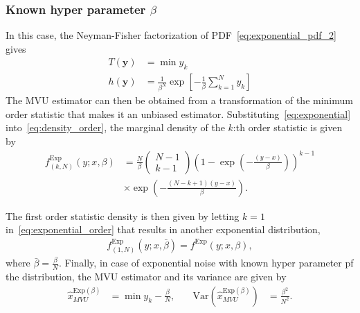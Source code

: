 \documentclass[journal]{IEEEtran}
\begin{document}
\subsubsection{Known hyper parameter $\beta$}
In this case, the Neyman-Fisher factorization of PDF~\eqref{eq:exponential_pdf_2} gives
%
%
\begin{subequations}
	\begin{align}
	T(\bm{y}) &= \min y_k\\
	h(\bm{y}) &=   \frac{1}{\beta^N}\exp\left[-\frac{1}{\beta}\sum_{k=1}^{N}y_k\right]
	\label{eq:exponential_known_ss}
	\end{align}
\end{subequations}
%
%
The MVU estimator can then be obtained from a transformation of the minimum order statistic that makes it an unbiased estimator. Substituting~\eqref{eq:exponential} into~\eqref{eq:density_order}, the marginal density of the $k$:th order statistic is given by
%
%
\begin{align}
f^{\mathrm{Exp}}_{(k,N)}(y;x,\beta) &= \frac{N}{\beta}\begin{pmatrix}N-1\\k-1\end{pmatrix}\left(1-\exp(-\frac{(y-x)}{\beta})\right)^{k-1}\nonumber\\&\times\exp\left(-\frac{(N-k+1)(y-x)}{\beta}\right).
\label{eq:exponential_order}
\end{align}
%
%

The first order statistic density is then given by letting $k=1$ in~\eqref{eq:exponential_order} that results in another exponential distribution,
%
%
\begin{align}
f^{\mathrm{Exp}}_{(1,N)}(y;x,\bar{\beta}) = f^{\mathrm{Exp}}(y;x,\beta),
\end{align}
%
%
where $\bar{\beta}=\frac{\beta}{N}$. Finally, in case of exponential noise with known hyper parameter pf the distribution, the MVU estimator and its variance are given by
%
%
\begin{align}
\hat{x}_{MVU}^{\mathrm{Exp}(\beta)} &= \min y_k - \frac{\beta}{N},
&\quad 
\mathrm{Var}(\hat{x}_{MVU}^{\mathrm{Exp}(\beta)}) &= \frac{\beta^2}{N^2}.
\end{align}
%
%
\end{document}
